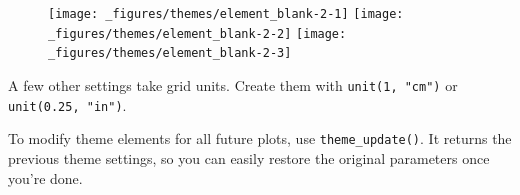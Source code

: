 \begin{itemize}
\begin{Shaded}
\begin{Highlighting}[]
\NormalTok{() +}\StringTok{ }\NormalTok{(} \NormalTok{())}
\NormalTok{() +}\StringTok{ }\NormalTok{(}
   \NormalTok{(), }
   \NormalTok{()}
\NormalTok{)}
\NormalTok{() +}\StringTok{ }\NormalTok{(} \NormalTok{(} \NormalTok{))}
\end{Highlighting}
\end{Shaded}

  \begin{figure}[H]
    \texttt{[image: \_figures/themes/element\_blank-2-1]}%
    \texttt{[image: \_figures/themes/element\_blank-2-2]}%
    \texttt{[image: \_figures/themes/element\_blank-2-3]}
  \end{figure}
\end{itemize}

A few other settings take grid units. Create them with
\texttt{unit(1,\ "cm")} or \texttt{unit(0.25,\ "in")}.

To modify theme elements for all future plots, use
\texttt{theme\_update()}. It returns the previous theme settings, so you
can easily restore the original parameters once you're done.
 

\begin{Shaded}
\begin{Highlighting}[]
\StringTok{ }\NormalTok{(}
   \NormalTok{(} \NormalTok{, } \NormalTok{),}
   \NormalTok{(} \NormalTok{, } \NormalTok{),}
   \NormalTok{(} \NormalTok{),}
   \NormalTok{(} \NormalTok{)}
\NormalTok{)}
\end{Highlighting}
\end{Shaded}

